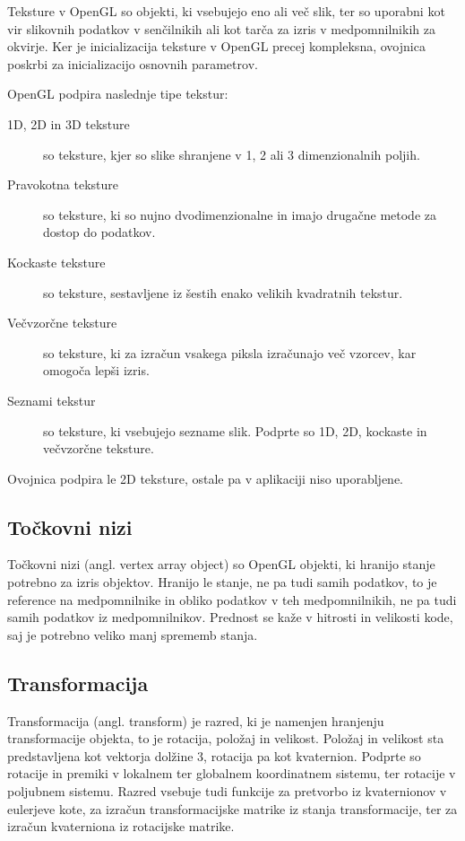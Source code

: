 \documentclass[a4paper, 12pt]{book}
\begin{document}
Teksture v OpenGL so objekti, ki vsebujejo eno ali več slik, ter so uporabni kot vir slikovnih podatkov v senčilnikih ali kot tarča za izris v medpomnilnikih za okvirje. Ker je inicializacija teksture v OpenGL precej kompleksna, ovojnica poskrbi za inicializacijo osnovnih parametrov.

OpenGL podpira naslednje tipe tekstur:

\begin{description}
\item [1D, 2D in 3D teksture]so teksture, kjer so slike shranjene v 1, 2 ali 3 dimenzionalnih poljih.
\item [Pravokotna teksture]so teksture, ki so nujno dvodimenzionalne in imajo drugačne metode za dostop do podatkov.
\item [Kockaste teksture]so teksture, sestavljene iz šestih enako velikih kvadratnih tekstur.
\item [Večvzorčne teksture]so teksture, ki za izračun vsakega piksla izračunajo več vzorcev, kar omogoča lepši izris.
\item [Seznami tekstur]so teksture, ki vsebujejo sezname slik. Podprte so 1D, 2D, kockaste in večvzorčne teksture.
\end{description}

Ovojnica podpira le 2D teksture, ostale pa v aplikaciji niso uporabljene.

\subsection{Točkovni nizi}

Točkovni nizi (angl. vertex array object) so OpenGL objekti, ki hranijo stanje potrebno za izris objektov. Hranijo le stanje, ne pa tudi samih podatkov, to je reference na medpomnilnike in obliko podatkov v teh medpomnilnikih, ne pa tudi samih podatkov iz medpomnilnikov. Prednost se kaže v hitrosti in velikosti kode, saj je potrebno veliko manj sprememb stanja.

\subsection{Transformacija}

Transformacija (angl. transform) je razred, ki je namenjen hranjenju transformacije objekta, to je rotacija, položaj in velikost. Položaj in velikost sta predstavljena kot vektorja dolžine 3, rotacija pa kot kvaternion\cite{quaternion}. Podprte so rotacije in premiki v lokalnem ter globalnem koordinatnem sistemu, ter rotacije v poljubnem sistemu. Razred vsebuje tudi funkcije za pretvorbo iz kvaternionov v eulerjeve kote, za izračun transformacijske matrike iz stanja transformacije, ter za izračun kvaterniona iz rotacijske matrike.
\end{document}
